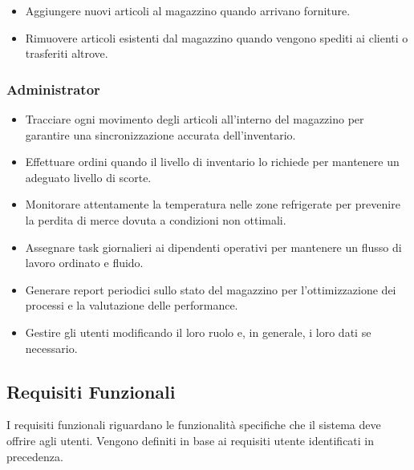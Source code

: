 \begin{itemize}
    \item Aggiungere nuovi articoli al magazzino quando arrivano forniture.
    \item Rimuovere articoli esistenti dal magazzino quando vengono spediti ai clienti o trasferiti altrove.
\end{itemize}

\subsubsection{Administrator}

\begin{itemize}
    \item Tracciare ogni movimento degli articoli all'interno del magazzino per garantire una sincronizzazione accurata dell'inventario.
    \item Effettuare ordini quando il livello di inventario lo richiede per mantenere un adeguato livello di scorte.
    \item Monitorare attentamente la temperatura nelle zone refrigerate per prevenire la perdita di merce dovuta a condizioni non ottimali.
    \item Assegnare task giornalieri ai dipendenti operativi per mantenere un flusso di lavoro ordinato e fluido.
    \item Generare report periodici sullo stato del magazzino per l'ottimizzazione dei processi e la valutazione delle performance.
    \item Gestire gli utenti modificando il loro ruolo e, in generale, i loro dati se necessario.
\end{itemize}

\subsection{Requisiti Funzionali}

I requisiti funzionali riguardano le funzionalità specifiche che il sistema
deve offrire agli utenti. Vengono definiti in base ai requisiti utente identificati in precedenza.

